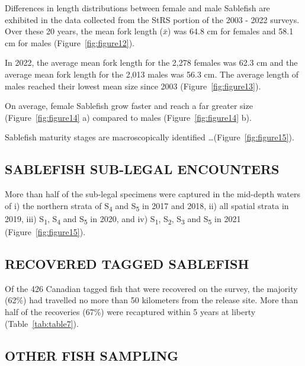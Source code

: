 \documentclass[12pt]{article}\usepackage[]{graphicx}\usepackage[]{color}
\begin{document}
Differences in length distributions between female and male Sablefish are exhibited in the data collected from the StRS portion of the 2003 - 2022 surveys. Over these 20 years, the mean fork length (\(\bar{x}\)) was 64.8 cm for females and 58.1 cm for males (Figure~\ref{fig:figure12}).

In 2022, the average mean fork length for the 2,278 females was 62.3 cm and the average mean fork length for the 2,013 males was 56.3 cm. The average length of males reached their lowest mean size since 2003 (Figure~\ref{fig:figure13}).

On average, female Sablefish grow faster and reach a far greater size (Figure~\ref{fig:figure14} a) compared to males (Figure~\ref{fig:figure14} b).

Sablefish maturity stages are macroscopically identified \ldots(Figure~\ref{fig:figure15}).

\hypertarget{sablefish-sub-legal-encounters}{%
\subsection{SABLEFISH SUB-LEGAL ENCOUNTERS}\label{sablefish-sub-legal-encounters}}

More than half of the sub-legal specimens were captured in the mid-depth waters of i) the northern strata of S\textsubscript{4} and S\textsubscript{5} in 2017 and 2018, ii) all spatial strata in 2019, iii) S\textsubscript{1}, S\textsubscript{4} and S\textsubscript{5} in 2020, and iv) S\textsubscript{1}, S\textsubscript{2}, S\textsubscript{3} and S\textsubscript{5} in 2021 (Figure~\ref{fig:figure15}).

\hypertarget{recovered-tagged-sablefish}{%
\subsection{RECOVERED TAGGED SABLEFISH}\label{recovered-tagged-sablefish}}

Of the 426 Canadian tagged fish that were recovered on the survey, the majority (62\%) had travelled no more than 50 kilometers from the release site. More than half of the recoveries (67\%) were recaptured within 5 years at liberty (Table~\ref{tab:table7}).

\hypertarget{other-fish-sampling}{%
\subsection{OTHER FISH SAMPLING}\label{other-fish-sampling}}
\end{document}
